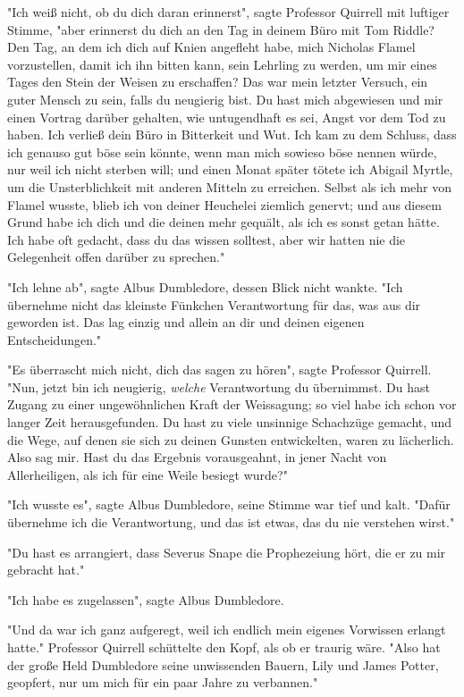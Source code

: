 {"Ich weiß nicht, ob du dich daran erinnerst", sagte Professor Quirrell mit luftiger Stimme, "aber erinnerst du dich an den Tag in deinem Büro mit Tom Riddle? Den Tag, an dem ich dich auf Knien angefleht habe, mich Nicholas Flamel vorzustellen, damit ich ihn bitten kann, sein Lehrling zu werden, um mir eines Tages den Stein der Weisen zu erschaffen? Das war mein letzter Versuch, ein guter Mensch zu sein, falls du neugierig bist. Du hast mich abgewiesen und mir einen Vortrag darüber gehalten, wie untugendhaft es sei, Angst vor dem Tod zu haben. Ich verließ dein Büro in Bitterkeit und Wut. Ich kam zu dem Schluss, dass ich genauso gut böse sein könnte, wenn man mich sowieso böse nennen würde, nur weil ich nicht sterben will; und einen Monat später tötete ich Abigail Myrtle, um die Unsterblichkeit mit anderen Mitteln zu erreichen. Selbst als ich mehr von Flamel wusste, blieb ich von deiner Heuchelei ziemlich genervt; und aus diesem Grund habe ich dich und die deinen mehr gequält, als ich es sonst getan hätte. Ich habe oft gedacht, dass du das wissen solltest, aber wir hatten nie die Gelegenheit offen darüber zu sprechen."

"Ich lehne ab", sagte Albus Dumbledore, dessen Blick nicht wankte. "Ich übernehme nicht das kleinste Fünkchen Verantwortung für das, was aus dir geworden ist. Das lag einzig und allein an dir und deinen eigenen Entscheidungen."

"Es überrascht mich nicht, dich das sagen zu hören", sagte Professor Quirrell. "Nun, jetzt bin ich neugierig, \emph{welche} Verantwortung du übernimmst. Du hast Zugang zu einer ungewöhnlichen Kraft der Weissagung; so viel habe ich schon vor langer Zeit herausgefunden. Du hast zu viele unsinnige Schachzüge gemacht, und die Wege, auf denen sie sich zu deinen Gunsten entwickelten, waren zu lächerlich. Also sag mir. Hast du das Ergebnis vorausgeahnt, in jener Nacht von Allerheiligen, als ich für eine Weile besiegt wurde?"

"Ich wusste es", sagte Albus Dumbledore, seine Stimme war tief und kalt. "Dafür übernehme ich die Verantwortung, und das ist etwas, das du nie verstehen wirst."

"Du hast es arrangiert, dass Severus Snape die Prophezeiung hört, die er zu mir gebracht hat."

"Ich habe es zugelassen", sagte Albus Dumbledore.

"Und da war ich ganz aufgeregt, weil ich endlich mein eigenes Vorwissen erlangt hatte." Professor Quirrell schüttelte den Kopf, als ob er traurig wäre. "Also hat der große Held Dumbledore seine unwissenden Bauern, Lily und James Potter, geopfert, nur um mich für ein paar Jahre zu verbannen."

}
